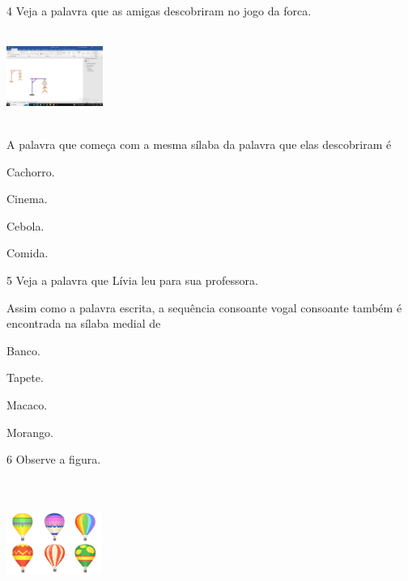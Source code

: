 \num{4} Veja a palavra que as amigas descobriram no jogo da forca.

\includegraphics[width=1.24236in,height=1.17500in]{media/image166.png}

A palavra que começa com a mesma sílaba da palavra que elas descobriram é

\begin{escolha}
\item Cachorro.

\item Cinema.

\item Cebola.

\item Comida.
\end{escolha}

\num{5} Veja a palavra que Lívia leu para sua professora.

Assim como a palavra escrita, a sequência consoante vogal consoante também é encontrada na sílaba medial de

\begin{escolha}
\item Banco.

\item Tapete.

\item Macaco.

\item Morango.
\end{escolha}

\num{6} Observe a figura.

\includegraphics[width=1.22569in,height=1.65417in]{media/image167.jpeg}


